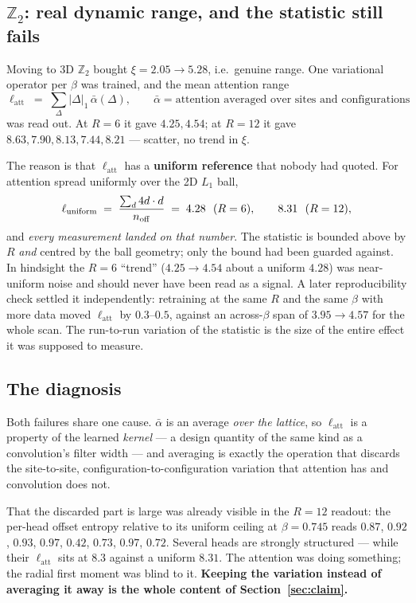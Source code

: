 \documentclass[11pt,a4paper]{article}
\newcommand{\latt}{\ell_{\mathrm{att}}}
\begin{document}
\subsection{$\mathbb{Z}_2$: real dynamic range, and the statistic still fails}

Moving to 3D $\mathbb{Z}_2$ bought $\xi = 2.05 \to 5.28$, i.e.\ genuine range.
One variational operator per $\beta$ was trained, and the mean attention range
\begin{equation}
  \latt \;=\; \sum_\Delta |\Delta|_1\, \bar\alpha(\Delta),
  \qquad
  \bar\alpha = \text{attention averaged over sites and configurations}
\end{equation}
was read out. At $R=6$ it gave $4.25, 4.54$; at $R=12$ it gave
$8.63, 7.90, 8.13, 7.44, 8.21$ --- scatter, no trend in $\xi$.

The reason is that $\latt$ has a \textbf{uniform reference} that nobody had
quoted. For attention spread uniformly over the 2D $L_1$ ball,
\begin{equation}
  \ell_{\rm uniform} \;=\; \frac{\sum_d 4d\cdot d}{n_{\rm off}}
  \;=\; 4.28 \ \ (R=6), \qquad 8.31 \ \ (R=12),
\end{equation}
and \emph{every measurement landed on that number}. The statistic is bounded
above by $R$ \emph{and} centred by the ball geometry; only the bound had been
guarded against. In hindsight the $R=6$ ``trend'' ($4.25 \to 4.54$ about a
uniform $4.28$) was near-uniform noise and should never have been read as a
signal. A later reproducibility check settled it independently: retraining at
the same $R$ and the same $\beta$ with more data moved $\latt$ by $0.3$--$0.5$,
against an across-$\beta$ span of $3.95 \to 4.57$ for the whole scan. The
run-to-run variation of the statistic is the size of the entire effect it was
supposed to measure.

\subsection{The diagnosis}

Both failures share one cause. $\bar\alpha$ is an average \emph{over the
lattice}, so $\latt$ is a property of the learned \emph{kernel} --- a design
quantity of the same kind as a convolution's filter width --- and averaging is
exactly the operation that discards the site-to-site,
configuration-to-configuration variation that attention has and convolution does
not.

That the discarded part is large was already visible in the $R=12$ readout: the
per-head offset entropy relative to its uniform ceiling at $\beta=0.745$ reads
$0.87$, $0.92$, $0.93$, $0.97$, $\mathbf{0.42}$, $0.73$, $0.97$,
$\mathbf{0.72}$. Several heads are strongly structured --- while their $\latt$
sits at $8.3$ against a uniform $8.31$. The attention was doing something; the
radial first moment was blind to it. \textbf{Keeping the variation instead of
averaging it away is the whole content of Section~\ref{sec:claim}.}
\end{document}
